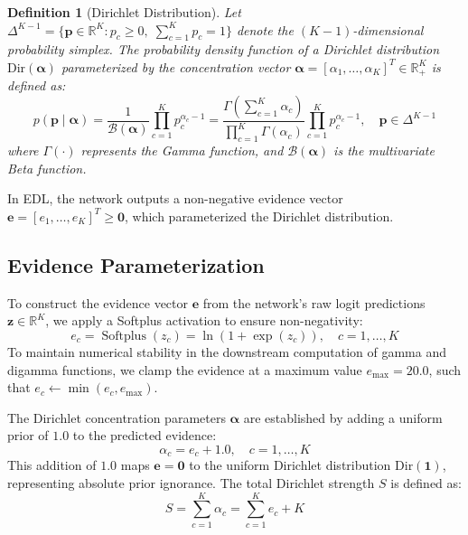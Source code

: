 \documentclass[11pt]{article}
\newtheorem{definition}{Definition}
\newcommand{\Dir}{\text{Dir}}
\newcommand{\R}{\mathbb{R}}
\DeclareMathOperator{\softplus}{Softplus}
\begin{document}
\begin{definition}[Dirichlet Distribution]
Let $\Delta^{K-1} = \{\bm{p} \in \R^K : p_c \ge 0,\; \sum_{c=1}^K p_c = 1\}$ denote the $(K{-}1)$-dimensional probability simplex. The probability density function of a Dirichlet distribution $\Dir(\bm{\alpha})$ parameterized by the concentration vector $\bm{\alpha} = [\alpha_1, \dots, \alpha_K]^T \in \R^K_+$ is defined as:
\begin{equation}\label{eq:dirichlet_pdf}
    p(\bm{p} \mid \bm{\alpha}) = \frac{1}{\mathcal{B}(\bm{\alpha})} \prod_{c=1}^K p_c^{\alpha_c - 1} = \frac{\Gamma\!\left(\sum_{c=1}^K \alpha_c\right)}{\prod_{c=1}^K \Gamma(\alpha_c)} \prod_{c=1}^K p_c^{\alpha_c - 1}, \quad \bm{p} \in \Delta^{K-1}
\end{equation}
where $\Gamma(\cdot)$ represents the Gamma function, and $\mathcal{B}(\bm{\alpha})$ is the multivariate Beta function.
\end{definition}

In EDL, the network outputs a non-negative evidence vector $\bm{e} = [e_1, \dots, e_K]^T \ge \bm{0}$, which parameterized the Dirichlet distribution.

\subsection{Evidence Parameterization}\label{subsec:evidence}

To construct the evidence vector $\bm{e}$ from the network's raw logit predictions $\bm{z} \in \R^K$, we apply a Softplus activation to ensure non-negativity:
\begin{equation}\label{eq:evidence}
    e_c = \softplus(z_c) = \ln(1 + \exp(z_c)), \quad c = 1, \dots, K
\end{equation}
To maintain numerical stability in the downstream computation of gamma and digamma functions, we clamp the evidence at a maximum value $e_{\max} = 20.0$, such that $e_c \leftarrow \min(e_c, e_{\max})$.

The Dirichlet concentration parameters $\bm{\alpha}$ are established by adding a uniform prior of $1.0$ to the predicted evidence:
\begin{equation}\label{eq:alpha}
    \alpha_c = e_c + 1.0, \quad c = 1, \dots, K
\end{equation}
This addition of $1.0$ maps $\bm{e} = \bm{0}$ to the uniform Dirichlet distribution $\Dir(\bm{1})$, representing absolute prior ignorance. The total Dirichlet strength $S$ is defined as:
\begin{equation}\label{eq:strength}
    S = \sum_{c=1}^K \alpha_c = \sum_{c=1}^K e_c + K
\end{equation}
\end{document}
